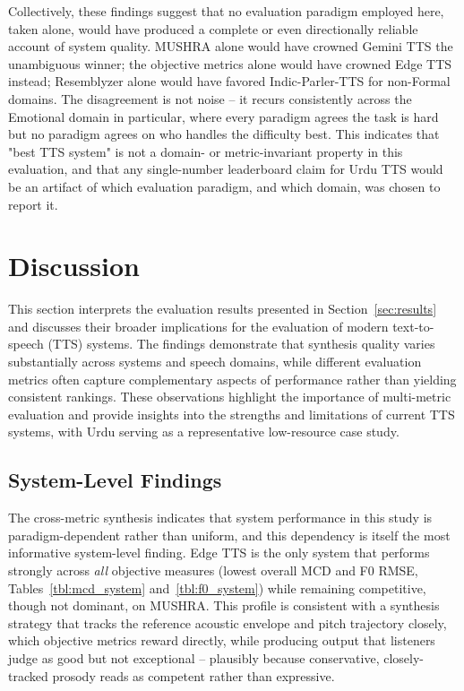 \documentclass[a4paper,fleqn]{cas-dc}
\begin{document}
    \hspace*{1.2em} Collectively, these findings suggest that no evaluation paradigm employed here, taken alone, would have produced a complete or even directionally reliable account of system quality. MUSHRA alone would have crowned Gemini TTS the unambiguous winner; the objective metrics alone would have crowned Edge TTS instead; Resemblyzer alone would have favored
    Indic-Parler-TTS for non-Formal domains. The disagreement is not noise --
    it recurs consistently across the Emotional domain in particular, where
    every paradigm agrees the task is hard but no paradigm agrees on who
    handles the difficulty best. This indicates that "best TTS system" is not
    a domain- or metric-invariant property in this evaluation, and that any
    single-number leaderboard claim for Urdu TTS would be an artifact of
    which evaluation paradigm, and which domain, was chosen to report it.
    
    \section{Discussion}\label{sec:discussion}

    \hspace*{1.2em} This section interprets the evaluation results presented in Section~\ref{sec:results} and discusses their broader implications for the evaluation of modern text-to-speech (TTS) systems. The findings demonstrate that synthesis quality varies substantially across systems and speech domains, while different evaluation metrics often capture complementary aspects of performance rather than yielding consistent rankings. These observations highlight the importance of multi-metric evaluation and provide insights into the strengths and limitations of current TTS systems, with Urdu serving as a representative low-resource case study.

    \subsection{System-Level Findings}\label{sec:discussion-system}
    
    \hspace*{1.2em} The cross-metric synthesis indicates that system performance in this study is paradigm-dependent rather than uniform, and this dependency is itself the most informative system-level finding. Edge TTS is the only system that performs strongly across \textit{all} objective measures (lowest
    overall MCD and F0 RMSE, Tables~\ref{tbl:mcd_system}
    and~\ref{tbl:f0_system}) while remaining competitive, though not dominant,
    on MUSHRA. This profile is consistent with a synthesis strategy that
    tracks the reference acoustic envelope and pitch trajectory closely,
    which objective metrics reward directly, while producing output that
    listeners judge as good but not exceptional -- plausibly because
    conservative, closely-tracked prosody reads as competent rather than
    expressive.
    
\end{document}
